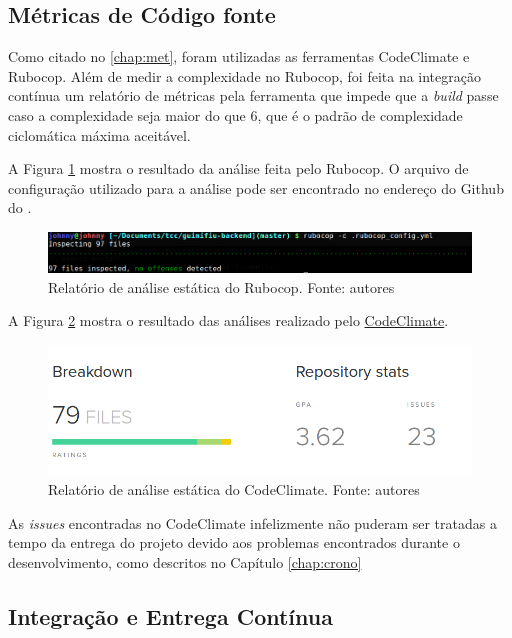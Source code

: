 \subsection{Métricas de Código fonte}

Como citado no \autoref{chap:met}, foram utilizadas as ferramentas CodeClimate e Rubocop. Além de medir a complexidade no Rubocop, foi feita na integração contínua um relatório de métricas pela ferramenta que impede que a \textit{build} passe caso a complexidade seja maior do que 6, que é o padrão de complexidade ciclomática máxima aceitável.

A Figura \ref{img:rubocop} mostra o resultado da análise feita pelo Rubocop. O arquivo de configuração utilizado para a análise pode ser encontrado no endereço do Github do  .

\begin{figure}[H]
    \centering
    \includegraphics[scale=0.5]{figuras/rubocop.png}
    \caption[Relatório de análise estática do Rubocop]{Relatório de análise estática do Rubocop. Fonte: autores}
    \label{img:rubocop}
\end{figure}

A Figura \ref{img:codeclimate} mostra o resultado das análises realizado pelo \href{https://codeclimate.com/github/Guimifiu/guimifiu-backend/}{CodeClimate}.

\begin{figure}[H]
    \centering
    \includegraphics[scale=0.5]{figuras/codeclimate.png}
    \caption[Relatório de análise estática do CodeClimate]{Relatório de análise estática do CodeClimate. Fonte: autores}
    \label{img:codeclimate}
\end{figure}

As \textit{issues} encontradas no CodeClimate infelizmente não puderam ser tratadas a tempo da entrega do projeto devido aos problemas encontrados durante o desenvolvimento, como descritos no Capítulo \ref{chap:crono}


\subsection{Integração e Entrega Contínua}

